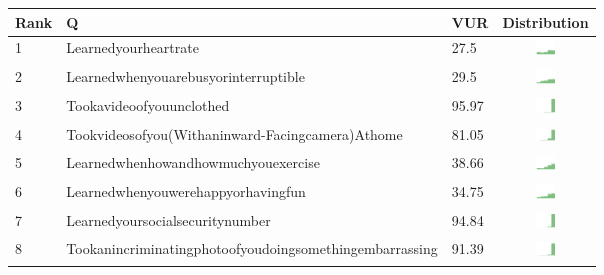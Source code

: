 \begin{table}[t]
\begin{center}
\small
\begin{tabular}{| p{0.5cm} | p{7cm} | p{1cm} | c |}
\hline
 Rank & Q &  VUR & Distribution  \\ 
\hline
1 & Learnedyourheartrate & 27.5 & \includegraphics[width = 0.5cm, height = 0.5cm]{../learnedyourheartratecombined} \\ 
2 & Learnedwhenyouarebusyorinterruptible & 29.5 & \includegraphics[width = 0.5cm, height = 0.5cm]{../learnedwhenyouarebusyorinterruptiblecombined} \\ 
3 & Tookavideoofyouunclothed & 95.97 & \includegraphics[width = 0.5cm, height = 0.5cm]{../tookavideoofyouunclothedcombined} \\ 
4 & Tookvideosofyou(Withaninward-Facingcamera)Athome & 81.05 & \includegraphics[width = 0.5cm, height = 0.5cm]{../tookvideosofyou(withaninward-facingcamera)athomecombined} \\ 
5 & Learnedwhenhowandhowmuchyouexercise & 38.66 & \includegraphics[width = 0.5cm, height = 0.5cm]{../learnedwhenhowandhowmuchyouexercisecombined} \\ 
6 & Learnedwhenyouwerehappyorhavingfun & 34.75 & \includegraphics[width = 0.5cm, height = 0.5cm]{../learnedwhenyouwerehappyorhavingfuncombined} \\ 
7 & Learnedyoursocialsecuritynumber & 94.84 & \includegraphics[width = 0.5cm, height = 0.5cm]{../learnedyoursocialsecuritynumbercombined} \\ 
8 & Tookanincriminatingphotoofyoudoingsomethingembarrassing & 91.39 & \includegraphics[width = 0.5cm, height = 0.5cm]{../tookanincriminatingphotoofyoudoingsomethingembarrassingcombined} \\ 

\end{tabular}
\end{center}
\end{table}
